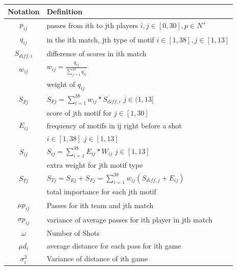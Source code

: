 \documentclass{mcmthesis}
\begin{document}
\begin{center}
\begin{tabular}{ c|l }
\hline
Notation&Definition\\
\hline

 $p_{ij} $&passes from ith to jth players $ i,j\in [0,30],p\in N^+ $  \\ 
 
 $q_{ij}  $&in the ith match, jth type of motif $ i\in [1,38],j\in[1,13]$ \\  
 
   $S_{diff,i} $&difference of scores in ith match\\
  
 $w_{ij}  $&$w_{ij}=\frac{q_{ij}}{\sum_{j=1}^{13}q_{ij}}$\\
 
 &weight of  $q_{ij} $ \\

  $S_{Fj}  $&$S_{Fj}= \sum_{i=1}^{38}w_{ij}*S_{diff,i}$ $j\in(1,13]$\\

 &score of jth motif for $j\in[1,30]$\\

 $E_{ij} $ &frequency of motifs in ij right before a shot \\

&$i\in[1,38]$ $j\in[1,13]$ \\

 $S_{ij} $ &$S_{ij}= \sum_{i=1}^{38}E_{ij}*W_{ij}$ $j\in[1,13]$\\

  &extra weight for jth motif type\\

 $S_{Tj} $  &$S_{Tj}= S_{Ej}+S_{Fj}=\sum_{i=1}^{38}w_{ij}(S_{diff,j}+E_{ij})$\\

  &total importance for each jth motif \\

  $\mu p_{ij}  $ &Passes for ith team and jth match\\

 $\sigma p_{ij} $ &variance of average passes for ith player in jth match\\

 $\omega  $&Number of Shots \\

 $\mu d_{i}  $&average distance for each pass for ith game \\

 $\sigma^2_{i} $&Variance of distance of ith game \\


\end{tabular}
\end{center}
\end{document}
